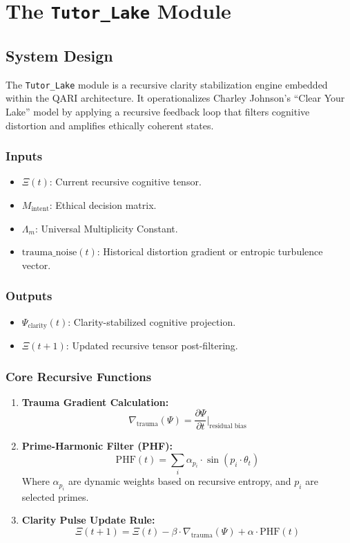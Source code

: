 \documentclass[12pt]{article}
\begin{document}
\section{The \texttt{Tutor\_Lake} Module}

\subsection{System Design}

The \texttt{Tutor\_Lake} module is a recursive clarity stabilization engine embedded within the QARI architecture. It operationalizes Charley Johnson's “Clear Your Lake” model by applying a recursive feedback loop that filters cognitive distortion and amplifies ethically coherent states.

\subsubsection*{Inputs}
\begin{itemize}
    \item $\Xi(t)$: Current recursive cognitive tensor.
    \item $M_{\text{intent}}$: Ethical decision matrix.
    \item $\Lambda_m$: Universal Multiplicity Constant.
    \item $\text{trauma\_noise}(t)$: Historical distortion gradient or entropic turbulence vector.
\end{itemize}

\subsubsection*{Outputs}
\begin{itemize}
    \item $\Psi_{\text{clarity}}(t)$: Clarity-stabilized cognitive projection.
    \item $\Xi(t+1)$: Updated recursive tensor post-filtering.
\end{itemize}

\subsubsection*{Core Recursive Functions}
\begin{enumerate}
    \item \textbf{Trauma Gradient Calculation:}
    \[
    \nabla_{\text{trauma}}(\Psi) = \frac{\partial \Psi}{\partial t} \bigg|_{\text{residual bias}}
    \]
    
    \item \textbf{Prime-Harmonic Filter (PHF):}
    \[
    \text{PHF}(t) = \sum_{i} \alpha_{p_i} \cdot \sin(p_i \cdot \theta_t)
    \]
    Where $\alpha_{p_i}$ are dynamic weights based on recursive entropy, and $p_i$ are selected primes.

    \item \textbf{Clarity Pulse Update Rule:}
    \[
    \Xi(t+1) = \Xi(t) - \beta \cdot \nabla_{\text{trauma}}(\Psi) + \alpha \cdot \text{PHF}(t)
    \]
\end{enumerate}
\end{document}

